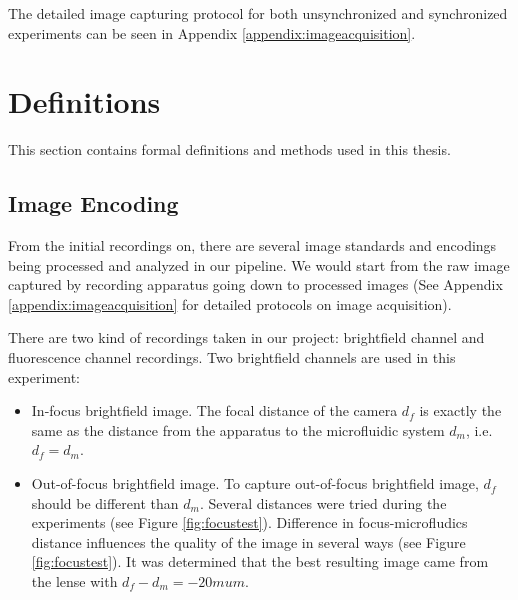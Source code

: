 \documentclass[pdftex,12pt,a4paper]{report}
\begin{document}
The detailed image capturing protocol for both unsynchronized and synchronized experiments can be seen in Appendix \ref{appendix:imageacquisition}.

\section{Definitions}

This section contains formal definitions and methods used in this thesis.

\subsection{Image Encoding}
\label{subsection:image_encoding}

From the initial recordings on, there are several image standards and encodings being processed and analyzed in our pipeline. We would start from the raw image captured by recording apparatus going down to processed images (See Appendix \ref{appendix:imageacquisition} for detailed protocols on image acquisition).

There are two kind of recordings taken in our project: brightfield channel and fluorescence channel recordings. Two brightfield channels are used in this experiment:

\begin{itemize}
\item In-focus brightfield image. The focal distance of the camera $d_f$ is exactly the same as the distance from the apparatus to the microfluidic system $d_m$, i.e. $d_f = d_m$.
\item Out-of-focus brightfield image. To capture out-of-focus brightfield image, $d_f$ should be different than $d_m$. Several distances were tried during the experiments (see Figure \ref{fig:focustest}). Difference in focus-microfludics distance influences the quality of the image in several ways (see Figure \ref{fig:focustest}). It was determined that the best resulting image came from the lense with $d_f - d_m = -20 mu m$.
\end{itemize}
\end{document}
